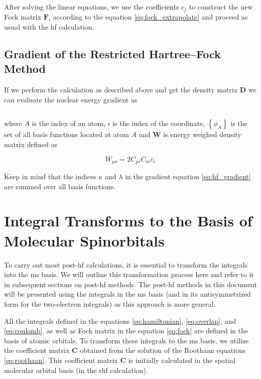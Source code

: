 After solving the linear equations, we use the coefficients \(c_j\) to construct the new Fock matrix \(\mathbf{F}_i\) according to the equation \eqref{eq:fock_extrapolate} and proceed as usual with the \acrshort{hf} calculation.

\subsection{Gradient of the Restricted Hartree--Fock Method}

If we perform the calculation as described above and get the density matrix \(\mathbf{D}\) we can evaluate the nuclear energy gradient as\cite{10.1002/9780470749593.hrs006}

\begin{equation}\label{eq:hf_gradient}
\end{equation}

where \(A\) is the index of an atom, \(i\) is the index of the coordinate, \(\left\lbrace\phi_A\right\rbrace\) is the set of all basis functions located at atom \(A\) and \(\mathbf{W}\) is energy weighed density matrix defined as

\begin{equation}
W_{\mu\nu}=2C_{\mu i}C_{\nu i}\varepsilon_i
\end{equation}

Keep in mind that the indices \(\kappa\) and \(\lambda\) in the gradient equation \eqref{eq:hf_gradient} are summed over all basis functions.

\section{\texorpdfstring{Integral Transforms to the Basis of Molecular Spinorbitals\label{sec:integral_transform}}{Integral Transforms to the Basis of Molecular Spinorbitals}}

To carry out most \acrfull{post-hf} calculations, it is essential to transform the integrals into the \acrfull{ms} basis. We will outline this transformation process here and refer to it in subsequent sections on \acrshort{post-hf} methods. The \acrshort{post-hf} methods in this document will be presented using the integrals in the \acrshort{ms} basis (and in its antisymmetrized form for the two-electron integrals) as this approach is more general.

All the integrals defined in the equations \eqref{eq:hamiltonian}, \eqref{eq:overlap}, and \eqref{eq:coulomb}, as well as Fock matrix in the equation \eqref{eq:fock} are defined in the basis of atomic orbitals. To transform these integrals to the \acrshort{ms} basis, we utilize the coefficient matrix \(\mathbf{C}\) obtained from the solution of the Roothaan equations \eqref{eq:roothaan}. This coefficient matrix \(\mathbf{C}\) is initially calculated in the spatial molecular orbital basis (in the \acrshort{rhf} calculation).

